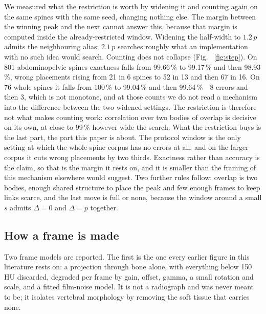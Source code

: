 \documentclass[11pt,letterpaper]{article}
\begin{document}
We measured what the restriction is worth by widening it and counting again on the same spines with the
same seed, changing nothing else. The margin between the winning peak and the next cannot answer this,
because that margin is computed inside the already-restricted window. Widening the half-width to $1.2\,p$
admits the neighbouring alias; $2.1\,p$ searches roughly what an implementation with no such idea would
search. Counting does not collapse (Fig.~
\ref{fig:step}). On 801 abdominopelvic spines exactness falls from 99.66\,\% to
99.17\,\% and then 98.93\,\%, wrong placements rising from 21 in 6 spines to 52 in 13 and then 67 in 16.
On 76 whole spines it falls from 100\,\% to 99.04\,\% and then 99.64\,\%---8 errors and then 3, which is
not monotone, and at those counts we do not read a mechanism into the difference between the two widened
settings. The restriction is therefore not what makes counting work: correlation over two bodies of
overlap is decisive on its own, at close to 99\,\% however wide the search. What the restriction buys is
the last part, the part this paper is about. The protocol window is the only setting at which the
whole-spine corpus has no errors at all, and on the larger corpus it cuts wrong placements by two thirds.
Exactness rather than accuracy is the claim, so that is the margin it rests on, and it is smaller than
the framing of this mechanism elsewhere would suggest. Two further rules follow: overlap
is two bodies, enough shared structure to place the peak and few enough frames to keep links scarce, and
the last move is full or none, because the window around a small $s$ admits $\Delta=0$ and $\Delta=p$
together.

\subsection*{How a frame is made}
Two frame models are reported. The first is the one every earlier figure in this literature rests on: a
projection through bone alone, with everything below 150\,HU discarded, degraded per frame by gain,
offset, gamma, a small rotation and scale, and a fitted film-noise model. It is not a radiograph and was
never meant to be; it isolates vertebral morphology by removing the soft tissue that carries none.
\end{document}
